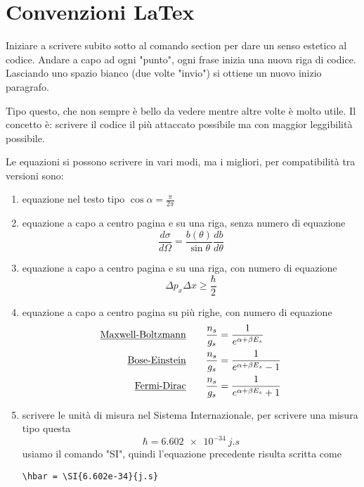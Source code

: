 


\section{Convenzioni LaTex} %
Iniziare a scrivere subito sotto al comando section per dare un senso estetico al codice.
Andare a capo ad ogni "punto", ogni frase inizia una nuova riga di codice.
Lasciando uno spazio bianco (due volte "invio") si ottiene un nuovo inizio paragrafo.

Tipo questo, che non sempre è bello da vedere mentre altre volte è molto utile.
Il concetto è: scrivere il codice il più attaccato possibile ma con maggior leggibilità possibile.

Le equazioni si possono scrivere in vari modi, ma i migliori, per compatibilità tra versioni sono:
\begin{enumerate}
\item equazione nel testo tipo $\cos \alpha = \frac{\pi}{2 \pi}$

\item equazione a capo a centro pagina e su una riga, senza numero di equazione
$$ \frac{d\sigma}{d\Omega}=\frac{b(\theta)}{\sin\theta}\frac{db}{d\theta} $$

\item equazione a capo a centro pagina e su una riga, con numero di equazione 
\begin{equation}
\Delta p_x \Delta x \ge \frac{\hbar}{2}
\end{equation}

\item equazione a capo a centro pagina su più righe, con numero di equazione
\begin{equation}
\begin{split}
\mbox{\underline{Maxwell-Boltzmann}}  \quad\quad  \frac{n_s}{g_s} & = \frac{1}{e^{\alpha + \beta E_s}} \\
\mbox{\underline{Bose-Einstein}}  \quad\quad  \frac{n_s}{g_s} & = \frac{1}{e^{\alpha + \beta E_s} - 1} \\
\mbox{\underline{Fermi-Dirac}}  \quad\quad  \frac{n_s}{g_s} & = \frac{1}{e^{\alpha + \beta E_s} + 1 } 
\end{split}
\end{equation}

\item scrivere le unità di misura nel Sistema Internazionale,
per scrivere una misura tipo questa
\begin{equation}
\hbar = \SI{6.602e-34}{j.s}
\end{equation}
usiamo il comando "SI", quindi l'equazione precedente risulta scritta come
\begin{verbatim}
\hbar = \SI{6.602e-34}{j.s}
\end{verbatim}

\end{enumerate}



